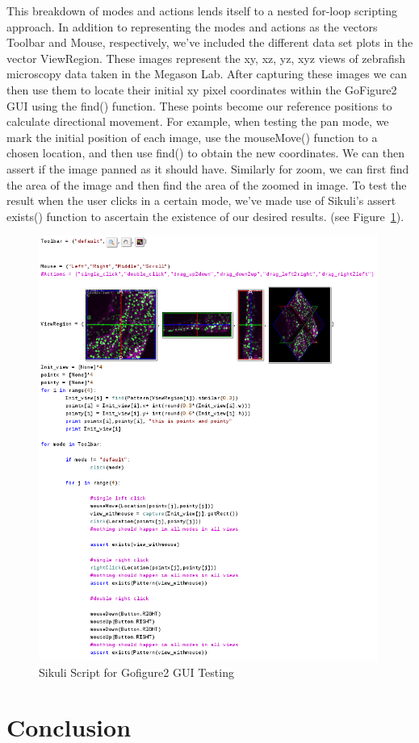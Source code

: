 \documentclass{InsightArticle}
\begin{document}
This breakdown of modes and actions lends itself to a nested for-loop scripting approach. In addition to representing the modes and actions
as the vectors Toolbar and Mouse, respectively, we've included the different data set plots in the vector ViewRegion.
These images represent the xy, xz, yz, xyz views of zebrafish microscopy data taken in the Megason Lab.  After capturing
these images we can then use them to locate their initial xy pixel coordinates within the GoFigure2 GUI using the find() function.  These points become 
our reference positions to calculate directional movement.  For example, when testing the pan mode, we mark the initial position of each image,
use the mouseMove() function to a chosen location, and then use find() to obtain the new coordinates.  We can then assert if the image panned as it should have.
Similarly for zoom, we can first find the area of the image and then find the area of the zoomed in image.  To test the result when the user clicks 
in a certain mode, we've made use of Sikuli's assert exists() function to ascertain the existence of our
desired results.        (see Figure~\ref{fig:Gofigure2Example}).

\begin{figure}[htp]
 \centering
 \includegraphics[width=0.99\textwidth]{Images/Gofigure2Example.png}
 \caption{Sikuli Script for Gofigure2 GUI Testing}
 \label{fig:Gofigure2Example}
\end{figure}
\section{Conclusion}

\clearpage



\end{document}
